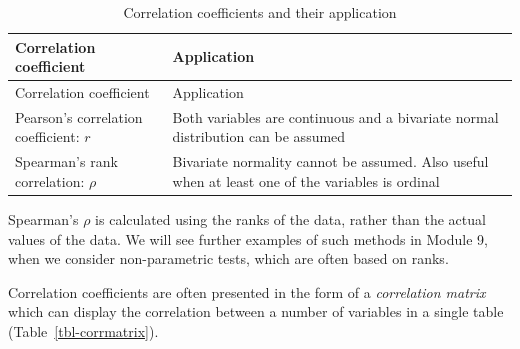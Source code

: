 \documentclass[
  a4paper,
]{memoir}
\begin{document}
\begin{longtable}[]{@{}
  >{\raggedright\arraybackslash}p{}
  >{\raggedright\arraybackslash}p{}@{}}
\caption{Correlation coefficients and their
application}\label{tbl-mod08-correlation-coefficients}\tabularnewline
\toprule\noalign{}
\begin{minipage}[b]{\linewidth}\raggedright
Correlation coefficient
\end{minipage} & \begin{minipage}[b]{\linewidth}\raggedright
Application
\end{minipage} \\
\midrule\noalign{}
\endfirsthead
\toprule\noalign{}
\begin{minipage}[b]{\linewidth}\raggedright
Correlation coefficient
\end{minipage} & \begin{minipage}[b]{\linewidth}\raggedright
Application
\end{minipage} \\
\midrule\noalign{}
\endhead
\bottomrule\noalign{}
\endlastfoot
Pearson's correlation coefficient: \(r\) & Both variables are continuous
and a bivariate normal distribution can be assumed \\
Spearman's rank correlation: \(\rho\) & Bivariate normality cannot be
assumed. Also useful when at least one of the variables is ordinal \\
\end{longtable}

Spearman's \(\rho\) is calculated using the ranks of the data, rather
than the actual values of the data. We will see further examples of such
methods in Module 9, when we consider non-parametric tests, which are
often based on ranks.

Correlation coefficients are often presented in the form of a
\emph{correlation matrix} which can display the correlation between a
number of variables in a single table (Table~\ref{tbl-corrmatrix}).
\end{document}
